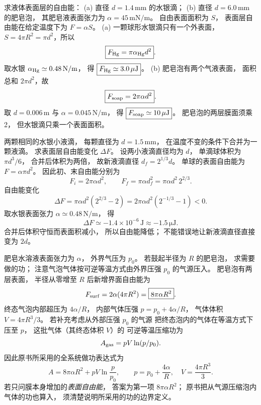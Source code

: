 求液体表面层的自由能：
(a) 直径 $d=1.4\,\mathrm{mm}$ 的水银滴；
(b) 直径 $d=6.0\,\mathrm{mm}$ 的肥皂泡，
其肥皂液表面张力为
$\alpha=45\,\mathrm{mN/m}$。
\exsolution
自由表面面积为 $S$，
表面层自由能在给定温度下为
$F=\alpha S$。
(a) 一颗球形水银滴只有一个外表面，
$S=4\pi R^2=\pi d^2$，所以
\[
\boxed{F_{\rm Hg}=\pi\alpha_{\rm Hg}d^2}.
\]
取水银
$\alpha_{\rm Hg}\simeq0.48\,\mathrm{N/m}$，
得
$\boxed{F_{\rm Hg}\simeq3.0\,\mathrm{\mu J}}$。
(b) 肥皂泡有两个气液表面，
面积总和 $2\pi d^2$，故
\[
\boxed{F_{\rm soap}=2\pi\alpha d^2}.
\]
取 $d=0.006\,\mathrm m$ 与
$\alpha=0.045\,\mathrm{N/m}$，
得
$\boxed{F_{\rm soap}\simeq10\,\mathrm{\mu J}}$。
\excheck 肥皂泡的两层膜面须乘2，
但水银滴只乘一个表面面积。

两颗相同的水银小液滴，
每颗直径为 $d=1.5\,\mathrm{mm}$，
在温度不变的条件下合并为一颗液滴。
求表面层自由能变化 $\Delta F$。
\exsolution
设两小液滴直径均为 $d$，
单滴球体积为
$\pi d^3/6$，
合并后体积为两倍，
故新液滴直径
$d_f=2^{1/3}d$。
单球的表面自由能为
$F=\alpha\pi d^2$。
因此初、末自由能分别为
\[
F_i=2\pi\alpha d^2,\qquad
F_f=\pi\alpha d_f^2
=\pi\alpha d^2\,2^{2/3}.
\]
自由能变化
\[
\boxed{\Delta F=\pi\alpha d^2(2^{2/3}-2)
=2\pi\alpha d^2(2^{-1/3}-1)<0}.
\]
取水银表面张力
$\alpha\simeq0.48\,\mathrm{N/m}$，
得
\[
\boxed{\Delta F\simeq-1.4\times10^{-6}\,\mathrm J
\approx-1.5\,\mathrm{\mu J}}.
\]
\excheck 合并后体积守恒而表面积减小，
所以自由能降低；
不能错误地让新液滴直径直接变为 $2d$。

肥皂水溶液表面张力为 $\alpha$，
外界气压为 $p_0$。
若鼓起半径为 $R$ 的肥皂泡，
求需要做的功；
注意气泡气体按可逆等温方式由外界压强
$p_0$ 的气源压入。
\exsolution
肥皂泡有两层表面，
半径从零增至 $R$ 后新增界面自由能为
\[
F_{\rm surf}=2\alpha(4\pi R^2)
=\boxed{8\pi\alpha R^2}.
\]
终态气泡内部超压为
$4\alpha/R$，
内部气体压强
$p=p_0+4\alpha/R$，
气体体积
$V=4\pi R^3/3$。
若补充考虑从外部压强 $p_0$ 的气源
把终态泡内的气体在等温方式下压至 $p$，
这批气体（其终态体积 $V$）的
可逆等温压缩功为
\[
A_{\rm gas}=pV\ln(p/p_0).
\]
因此原书所采用的全系统做功表达式为
\[
\boxed{A=8\pi\alpha R^2+
pV\ln\frac{p}{p_0}},\qquad
p=p_0+\frac{4\alpha}{R},\quad
V=\frac{4\pi R^3}{3}.
\]
\excheck 若只问膜本身增加的\emph{表面自由能}，
答案为第一项 $8\pi\alpha R^2$；
原书把从气源压缩泡内气体的功也算入，
须清楚说明所采用的功的边界定义。

